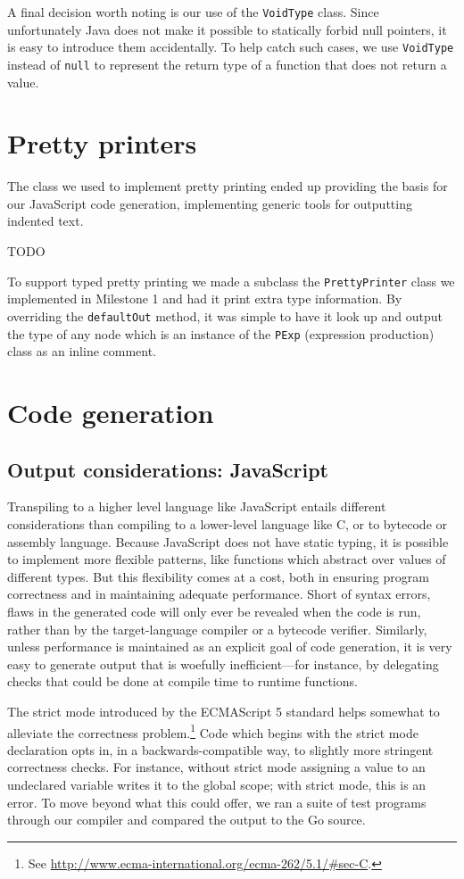 \documentclass[oneside]{article}
\begin{document}
A final decision worth noting is our use of the \texttt{VoidType} class. Since unfortunately Java does not make it possible to statically forbid null pointers, it is easy to introduce them accidentally. To help catch such cases, we use \texttt{VoidType} instead of \texttt{null} to represent the return type of a function that does not return a value.

\section{Pretty printers}
The class we used to implement pretty printing ended up providing the basis for our JavaScript code generation, implementing generic tools for outputting indented text.

TODO

To support typed pretty printing we made a subclass the \verb|PrettyPrinter| class we implemented in Milestone 1 and had it print extra type information. By overriding the \verb|defaultOut| method, it was simple to have it look up and output the type of any node which is an instance of the \verb|PExp| (expression production) class as an inline comment.

\section{Code generation}
\subsection{Output considerations: JavaScript}
Transpiling to a higher level language like JavaScript entails different considerations than compiling to a lower-level language like C, or to bytecode or assembly language. Because JavaScript does not have static typing, it is possible to implement more flexible patterns, like functions which abstract over values of different types. But this flexibility comes at a cost, both in ensuring program correctness and in maintaining adequate performance. Short of syntax errors, flaws in the generated code will only ever be revealed when the code is run, rather than by the target-language compiler or a bytecode verifier. Similarly, unless performance is maintained as an explicit goal of code generation, it is very easy to generate output that is woefully inefficient---for instance, by delegating checks that could be done at compile time to runtime functions.

The strict mode introduced by the ECMAScript 5 standard helps somewhat to alleviate the correctness problem.\footnote{See \url{http://www.ecma-international.org/ecma-262/5.1/\#sec-C}.} Code which begins with the strict mode declaration opts in, in a backwards-compatible way, to slightly more stringent correctness checks. For instance, without strict mode assigning a value to an undeclared variable writes it to the global scope; with strict mode, this is an error. To move beyond what this could offer, we ran a suite of test programs through our compiler and compared the output to the Go source.
\end{document}
